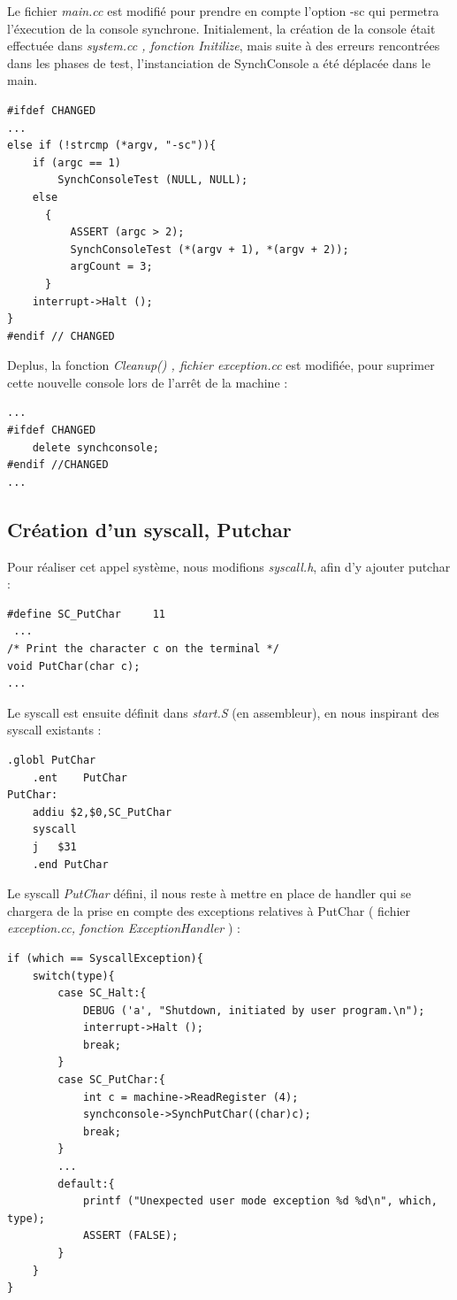 \documentclass[a4paper,10pt]{article}
\begin{document}
Le fichier \textit{main.cc} est modifié pour prendre en compte l'option -sc qui permetra l'éxecution
de la console synchrone. Initialement, la création de la console était effectuée dans \textit{system.cc , fonction Initilize}, mais suite à des erreurs
rencontrées dans les phases de test, l'instanciation de SynchConsole a été déplacée dans le main.
\begin{lstlisting}[frame=single]
#ifdef CHANGED
...
else if (!strcmp (*argv, "-sc")){
	if (argc == 1)
	    SynchConsoleTest (NULL, NULL);
	else
	  {
	      ASSERT (argc > 2);
	      SynchConsoleTest (*(argv + 1), *(argv + 2));
	      argCount = 3;
	  }
	interrupt->Halt ();
}
#endif // CHANGED
\end{lstlisting}
Deplus, la fonction \textit{Cleanup() , fichier exception.cc} est modifiée, pour suprimer cette nouvelle console lors de l'arrêt de la machine :
\begin{lstlisting}[frame=single]
...
#ifdef CHANGED
    delete synchconsole;
#endif //CHANGED
...
\end{lstlisting}
\newpage
\subsection{Création d'un syscall, Putchar}
Pour réaliser cet appel système, nous modifions \textit{syscall.h}, afin d'y ajouter putchar :
\begin{lstlisting}[frame=single]
 #define SC_PutChar		11
 ...
/* Print the character c on the terminal */
void PutChar(char c);
...
\end{lstlisting}
Le syscall est ensuite définit dans \textit{start.S} (en assembleur), en nous inspirant des syscall existants :
\begin{lstlisting}[frame=single]
	.globl PutChar
	.ent	PutChar
PutChar:
	addiu $2,$0,SC_PutChar
	syscall
	j	$31
	.end PutChar
\end{lstlisting}
Le syscall \textit{PutChar} défini, il nous reste à mettre en place de handler qui se chargera de la prise en compte
des exceptions relatives à PutChar ( fichier \textit{exception.cc, fonction ExceptionHandler} ) :

\begin{lstlisting}[frame=single]
if (which == SyscallException){
	switch(type){
		case SC_Halt:{
			DEBUG ('a', "Shutdown, initiated by user program.\n");
			interrupt->Halt ();
			break;
		}
		case SC_PutChar:{
			int c = machine->ReadRegister (4);
			synchconsole->SynchPutChar((char)c);
			break;
		}
		...
		default:{
			printf ("Unexpected user mode exception %d %d\n", which, type);
			ASSERT (FALSE);
		}
	}
}
\end{lstlisting}
\newpage
\end{document}
